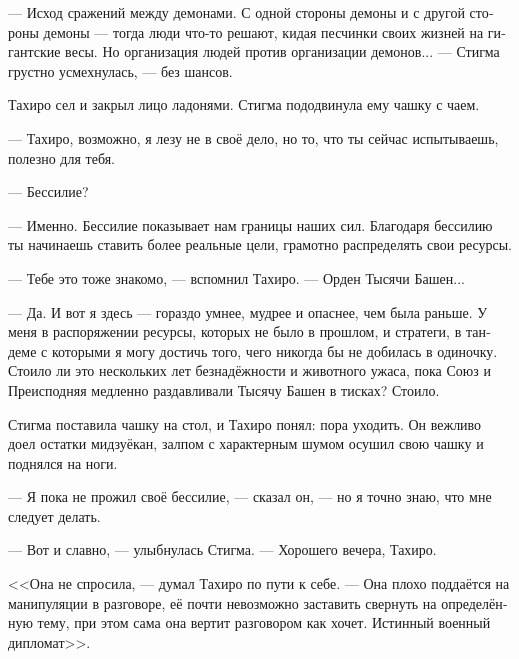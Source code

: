 \documentclass[a4paper,12pt,fleqn]{book}\usepackage{polyglossia}\setdefaultlanguage[babelshorthands=true]{russian}\setotherlanguage{english}\defaultfontfeatures{Ligatures=TeX,Mapping=tex-text}\usepackage{xcolor}\newcommand{\ml}[3]{#2}
\begin{document}
{\ml{$0$}
{--- Исход сражений между демонами.}
{``Battles between daemons.}
\ml{$0$}
{С одной стороны демоны и с другой стороны демоны --- тогда люди что-то решают, кидая песчинки своих жизней на гигантские весы.}
{Daemons on one side, daemons on the other---then and only then humans contribute, throwin' grains of their lives on the giant scales.}
\ml{$0$}
{Но организация людей против организации демонов... --- Стигма грустно усмехнулась, --- без шансов.}
{But a human organization against a daemon organization---'' Stigma sadly laughed, ``---stands no chance.''}

Тахиро сел и закрыл лицо ладонями.
Стигма пододвинула ему чашку с чаем.

\ml{$0$}
{--- Тахиро, возможно, я лезу не в своё дело, но то, что ты сейчас испытываешь, полезно для тебя.}
{``Tahiro, maybe that's not my business, but what you're experiencin' is pretty good for you.''}

\ml{$0$}
{--- Бессилие?}
{``Powerlessness?''}

\ml{$0$}
{--- Именно.}
{``Exactly.}
\ml{$0$}
{Бессилие показывает нам границы наших сил.}
{Powerlessness shows us limits of our power.}
Благодаря бессилию ты начинаешь ставить более реальные цели, грамотно распределять свои ресурсы.

--- Тебе это тоже знакомо, --- вспомнил Тахиро.
--- Орден Тысячи Башен...

--- Да.
\ml{$0$}
{И вот я здесь --- гораздо умнее, мудрее и опаснее, чем была раньше.}
{And here I am---more clever, wise, and dangerous than before.}
У меня в распоряжении ресурсы, которых не было в прошлом, и стратеги, в тандеме с которыми я могу достичь того, чего никогда бы не добилась в одиночку.
Стоило ли это нескольких лет безнадёжности и животного ужаса, пока Союз и Преисподняя медленно раздавливали Тысячу Башен в тисках?
Стоило.

Стигма поставила чашку на стол, и Тахиро понял: пора уходить.
Он вежливо доел остатки мидзуёкан, залпом с характерным шумом осушил свою чашку и поднялся на ноги.

--- Я пока не прожил своё бессилие, --- сказал он, --- но я точно знаю, что мне следует делать.

--- Вот и славно, --- улыбнулась Стигма.
--- Хорошего вечера, Тахиро.

<<Она не спросила, --- думал Тахиро по пути к себе.
--- Она плохо поддаётся на манипуляции в разговоре, её почти невозможно заставить свернуть на определённую тему, при этом сама она вертит разговором как хочет.
Истинный военный дипломат>>.

}
\end{document}
